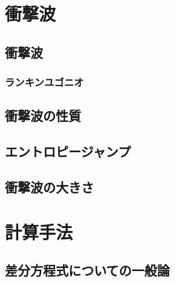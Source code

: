 \documentclass{jsarticle}
\begin{document}
\section{衝撃波}
\subsection{衝撃波}
\subsubsection{ランキンユゴニオ}
\subsection{衝撃波の性質}
\subsection{エントロピージャンプ}
\subsection{衝撃波の大きさ}
\section{計算手法}
\subsection{差分方程式についての一般論}
\end{document}

